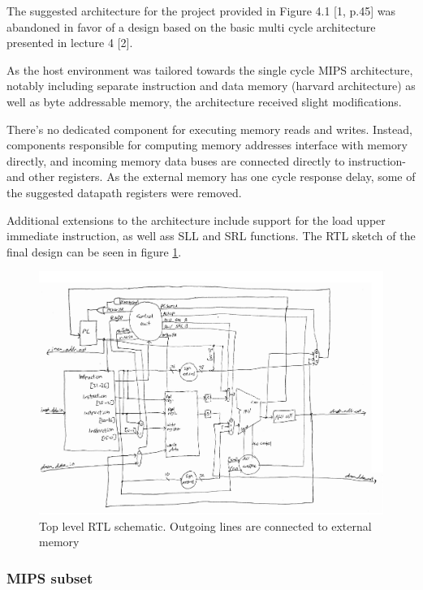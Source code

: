 The suggested architecture for the project provided in Figure 4.1 [1, p.45] was abandoned in favor of a design based on the basic multi cycle architecture presented in lecture 4 [2].

As the host environment was tailored towards the single cycle MIPS architecture, notably including separate instruction and data memory (harvard architecture) as well as byte addressable memory, the architecture received slight modifications.

There's no dedicated component for executing memory reads and writes.
Instead, components responsible for computing memory addresses interface with memory directly, and incoming memory data buses are connected directly to instruction- and other registers.
As the external memory has one cycle response delay, some of the suggested datapath registers were removed.

Additional extensions to the architecture include support for the load upper immediate instruction, as well ass SLL and SRL functions.
The RTL sketch of the final design can be seen in figure \ref{fig:top_level_rtl}.

\begin{figure}[ht!]
    \begin{center}
    \includegraphics[width=1.2\textwidth]{assets/top_level_rtl.pdf}
    \caption{Top level RTL schematic. Outgoing lines are connected to external memory}
    \label{fig:top_level_rtl}
    \end{center}
\end{figure}

\subsubsection{MIPS subset}

